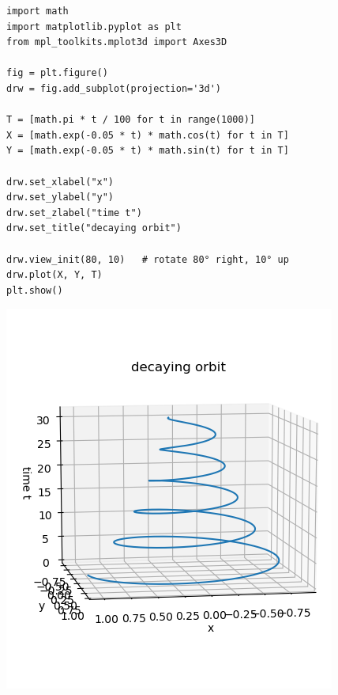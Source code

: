 \begin{frame}[fragile]
%
\begin{codebox}[Example: 3D Curve, width=.6\linewidth, nobeforeafter, equal height group = grpXmp3DCurve]
\begin{verbatim}
import math
import matplotlib.pyplot as plt
from mpl_toolkits.mplot3d import Axes3D

fig = plt.figure()
drw = fig.add_subplot(projection='3d')

T = [math.pi * t / 100 for t in range(1000)]
X = [math.exp(-0.05 * t) * math.cos(t) for t in T]
Y = [math.exp(-0.05 * t) * math.sin(t) for t in T]

drw.set_xlabel("x")
drw.set_ylabel("y")
drw.set_zlabel("time t")
drw.set_title("decaying orbit")

drw.view_init(80, 10)   # rotate 80° right, 10° up
drw.plot(X, Y, T)
plt.show()
\end{verbatim}
\end{codebox}
%
\begin{tcolorbox}[title=Output: 3D Curve, width=.34\linewidth, nobeforeafter, equal height group = grpXmp3DCurve]
	\hspace{-13pt}
	\includegraphics[width=1.22\linewidth]{./gfx/plt-orbit3D}
\end{tcolorbox}
%
\end{frame}

